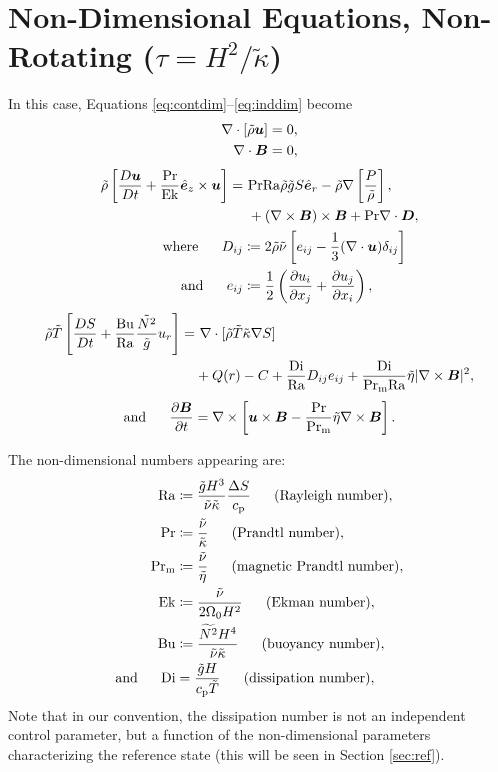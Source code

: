 \documentclass[12pt]{article}
\numberwithin{equation}{section}
\begin{document}
	\section{Non-Dimensional Equations, Non-Rotating ($\tau=H^2/\tilde{\kappa}$)}
	In this case, Equations \eqref{eq:contdim}--\eqref{eq:inddim} become 
	\begin{align}
	\nabla\cdot[\tilde{\rho}\bm{u}] &= 0\label{eq:contndvisc},\\
	\nabla\cdot \bm{B} &= 0,
\end{align}
\begin{subequations}\label{eq:momndvisc}
	\begin{align}
		\tilde{\rho}\left[\frac{D\bm{u}}{Dt}+\frac{{\rm{Pr}}}{{\rm{Ek}}}\hat{\bm{e}}_z\times\bm{u}\right] = &\ {\rm{Pr}}{\rm{Ra}}\tilde{\rho}\tilde{g} S\hat{\bm{e}}_r         -\tilde{\rho}\nabla\left[ \frac{P}{\tilde{\rho}} \right], \nonumber\\
		&\ +(\nabla\times\bm{B})\times\bm{B} +{\rm{Pr}}\nabla\cdot\bm{D},\\
		\text{where}\ \ \ \ \  D_{ij} &\coloneqq 2\tilde{\rho}\tilde{\nu} \left[e_{ij} - \frac{1}{3}(\nabla\cdot\bm{u}) \delta_{ij} \right]\\
		\text{and}\ \ \ \ \  e_{ij} &\coloneqq \frac{1}{2}\left(\frac{\partial u_i}{\partial x_j} + \frac{\partial u_j}{\partial x_i} \right),
	\end{align}
\end{subequations}
\begin{align}\label{eq:enndvisc}
	\rhotilde\tmptilde\left[ \matderiv{S} + \frac{\bu}{\ra}\frac{\nsqtilde}{\gtilde} u_r\right]  = &\ \Div[\rhotilde \tmptilde \kappatilde \nabla S] \nonumber \\
	&+ Q(r) -C + \frac{\di}{\ra} D_{ij}e_{ij} + \frac{\di}{\prm\ra} \etatilde|\curl\vecb|^2,
\end{align}
\begin{align}\label{eq:indndvisc}
	\text{and}\ \ \ \ \  \frac{\partial\bm{B}}{\partial t} = \nabla\times\left[\bm{u}\times\bm{B} - \frac{{\rm{Pr}}}{{\rm{Pr_m}}}\tilde{\eta}\nabla\times\bm{B}\right].
\end{align}	

The non-dimensional numbers appearing are:
\begin{subequations}
\begin{align}
	{\rm{Ra}} &\coloneqq \frac{\tilde{g} H^3}{\tilde{\nu} \tilde{\kappa}} \frac{\Delta S}{c_{\rm{p}}}\ \ \ \ \ \text{(Rayleigh number)},\\ 
	{\rm{Pr}} &\coloneqq \frac{\tilde{\nu}}{\tilde{\kappa}}\ \ \ \ \ \text{(Prandtl number)},\\
	{\rm{Pr_m}} &\coloneqq \frac{\tilde{\nu}}{\tilde{\eta}}\ \ \ \ \ \text{(magnetic Prandtl number)},\\
	{\rm{Ek}} &\coloneqq \frac{\tilde{\nu}}{2\Omega_0H^2}\ \ \ \ \ \text{(Ekman number)},\\	
	{\rm{Bu}} &\coloneqq \frac{\widetilde{N^2}H^4}{\tilde{\nu}\tilde{\kappa}}\ \ \ \ \ \text{(buoyancy number)},\\
	\text{and}\ \ \ \ \  {\rm{Di}} &= \frac{\tilde{g}H}{c_{\rm{p}}\tilde{T}}\ \ \ \ \ \text{(dissipation number)},
\end{align}
\end{subequations}
Note that in our convention, the dissipation number is not an independent control parameter, but a function of the non-dimensional parameters characterizing the reference state (this will be seen in Section \ref{sec:ref}). 
\end{document}
